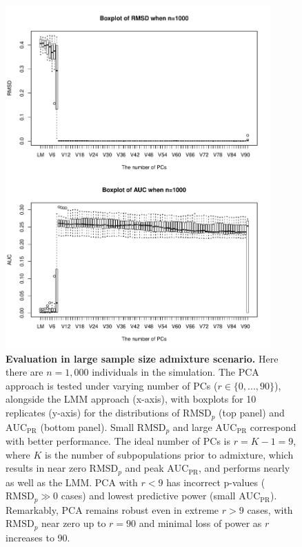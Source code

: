 \documentclass[11pt]{article}
\newcommand{\rmsd}{\text{RMSD}_p}
\newcommand{\auc}{\text{AUC}_\text{PR}}
\begin{document}
\begin{figure}[bp!]
  \centering
  \includegraphics[width=4in]{PCA_n_1000_m_10_k_10.pdf}
  \caption{
    {\bf Evaluation in large sample size admixture scenario.}
    Here there are $n = 1,000$ individuals in the simulation.
    The PCA approach is tested under varying number of PCs ($r \in \{0, ..., 90\}$), alongside the LMM approach (x-axis), with boxplots for 10 replicates (y-axis) for the distributions of $\rmsd$ (top panel) and $\auc$ (bottom panel).
    Small $\rmsd$ and large $\auc$ correspond with better performance.
    The ideal number of PCs is $r = K-1 = 9$, where $K$ is the number of subpopulations prior to admixture, which results in near zero $\rmsd$ and peak $\auc$, and performs nearly as well as the LMM.
    PCA with $r < 9$ has incorrect p-values ($\rmsd \gg 0$ cases) and lowest predictive power (small $\auc$).
    Remarkably, PCA remains robust even in extreme $r > 9$ cases, with $\rmsd$ near zero up to $r = 90$ and minimal loss of power as $r$ increases to 90.
  }
  \label{fig:large_sample_size}
\end{figure}

\end{document}
